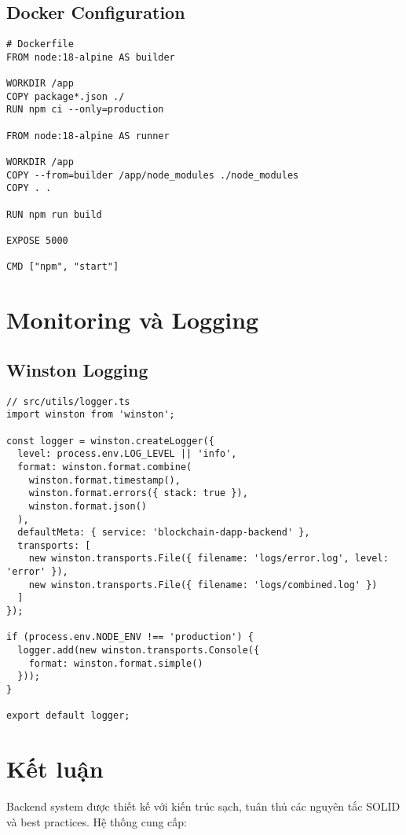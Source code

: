 \documentclass[12pt,a4paper]{article}
\begin{document}
\subsection{Docker Configuration}
\begin{lstlisting}[caption=Dockerfile]
# Dockerfile
FROM node:18-alpine AS builder

WORKDIR /app
COPY package*.json ./
RUN npm ci --only=production

FROM node:18-alpine AS runner

WORKDIR /app
COPY --from=builder /app/node_modules ./node_modules
COPY . .

RUN npm run build

EXPOSE 5000

CMD ["npm", "start"]
\end{lstlisting}

\section{Monitoring và Logging}

\subsection{Winston Logging}
\begin{lstlisting}[caption=Logging Configuration]
// src/utils/logger.ts
import winston from 'winston';

const logger = winston.createLogger({
  level: process.env.LOG_LEVEL || 'info',
  format: winston.format.combine(
    winston.format.timestamp(),
    winston.format.errors({ stack: true }),
    winston.format.json()
  ),
  defaultMeta: { service: 'blockchain-dapp-backend' },
  transports: [
    new winston.transports.File({ filename: 'logs/error.log', level: 'error' }),
    new winston.transports.File({ filename: 'logs/combined.log' })
  ]
});

if (process.env.NODE_ENV !== 'production') {
  logger.add(new winston.transports.Console({
    format: winston.format.simple()
  }));
}

export default logger;
\end{lstlisting}

\section{Kết luận}

Backend system được thiết kế với kiến trúc sạch, tuân thủ các nguyên tắc SOLID và best practices. Hệ thống cung cấp:
\end{document}
